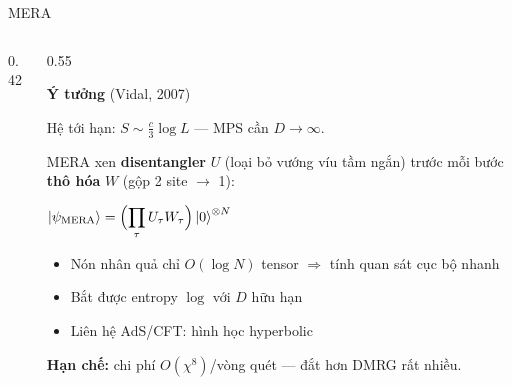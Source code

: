 \documentclass[aspectratio=169, 11pt]{beamer}
\newcommand{\eqn}[1]{\begin{center}\colorbox{eqbox}{\color{qcyan}$\displaystyle #1$}\end{center}}
\begin{document}
\begin{frame}[shrink=3]{MERA}
\begin{columns}[T]
\begin{column}{0.42\textwidth}
\end{column}
\begin{column}{0.55\textwidth}

\textcolor{qpurple}{\textbf{Ý tưởng}} (Vidal, 2007)\\[3pt]
{\small Hệ tới hạn: $S \sim \frac{c}{3}\log L$ — MPS cần $D\to\infty$.

\vspace{3pt}
MERA xen \textbf{disentangler} $U$ (loại bỏ vướng víu tầm ngắn) trước mỗi bước \textbf{thô hóa} $W$ (gộp 2 site $\to$ 1):}
\eqn{\ket{\psi_{\text{MERA}}} = \Bigl(\prod_{\tau} U_\tau W_\tau\Bigr)\ket{0}^{\otimes N}}

\vspace{2pt}
{\small
\begin{itemize}
  \item Nón nhân quả chỉ $O(\log N)$ tensor $\Rightarrow$ tính quan sát cục bộ nhanh
  \item Bắt được entropy $\log$ với $D$ hữu hạn
  \item Liên hệ AdS/CFT: hình học hyperbolic
\end{itemize}}

\vspace{4pt}
\textcolor{qpink}{\textbf{Hạn chế:}} {\small chi phí $O(\chi^8)$/vòng quét — đắt hơn DMRG rất nhiều.}

\end{column}
\end{columns}

\end{frame}
\end{document}
